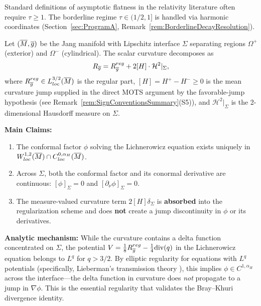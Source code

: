 \begin{remark}
Standard definitions of asymptotic flatness in the relativity
literature often require $\tau \ge 1$. The borderline regime $\tau \in (1/2, 1]$ is handled via harmonic coordinates (Section~\ref{sec:ProgramA}, Remark~\ref{rem:BorderlineDecayResolution}).
\end{remark}

\begin{lemma}\label{lem:Transmission}
Let $(\overline{M}, \overline{g})$ be the Jang manifold with Lipschitz interface $\Sigma$ separating regions $\Omega^+$ (exterior) and $\Omega^-$ (cylindrical). The scalar curvature decomposes as
\begin{equation}\label{eq:ScalarDecomp}
    R_{\overline{g}} = R_{\overline{g}}^{reg} + 2[H] \cdot \mathcal{H}^2|_\Sigma,
\end{equation}
where $R_{\overline{g}}^{reg} \in L^{3/2}_{loc}(\overline{M})$ is the regular part, $[H] = H^+ - H^- \ge 0$ is the mean curvature jump supplied in the direct MOTS argument by the favorable-jump hypothesis (see Remark~\ref{rem:SignConventionsSummary}(S5)), and $\mathcal{H}^2|_\Sigma$ is the 2-dimensional Hausdorff measure on $\Sigma$.

\textbf{Main Claims:} 
\begin{enumerate}
    \item[(i)] The conformal factor $\phi$ solving the Lichnerowicz equation exists uniquely in $W^{1,2}_{loc}(\overline{M}) \cap C^{0,\alpha_H}_{loc}(\overline{M})$.
    \item[(ii)] Across $\Sigma$, both the conformal factor and its conormal derivative are continuous: $[\phi]_\Sigma = 0$ and $[\partial_\nu \phi]_\Sigma = 0$.
    \item[(iii)] The measure-valued curvature term $2[H]\delta_\Sigma$ is \textbf{absorbed} into the regularization scheme and does \textbf{not} create a jump discontinuity in $\phi$ or its derivatives.
\end{enumerate}

\textbf{Analytic mechanism:} While the curvature contains a delta function concentrated on $\Sigma$, the potential $V = \frac{1}{8}R_{\overline{g}}^{reg} - \frac{1}{4}\mathrm{div}(q)$ in the Lichnerowicz equation belongs to $L^{q}$ for $q > 3/2$. By elliptic regularity for equations with $L^q$ potentials (specifically, Lieberman's transmission theory \cite{lieberman1988}), this implies $\phi \in C^{1,\alpha_H}$ across the interface---the delta function in curvature does \emph{not} propagate to a jump in $\nabla \phi$. This is the essential regularity that validates the Bray--Khuri divergence identity.
\end{lemma}

